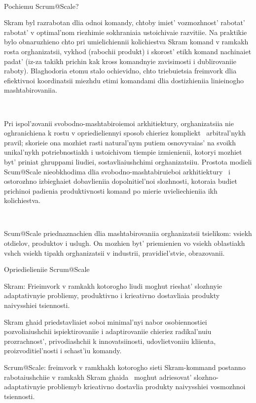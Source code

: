 \documentclass[10pt]{article}
\begin{document}
~

Pochiemu Scrum@Scale?

Skram byl razrabotan dlia odnoi komandy, chtoby imiet' vozmozhnost' rabotat'
rabotat' v optimal'nom riezhimie sokhraniaia ustoichivaie razvitiie. Na praktikie
bylo obnaruzhieno chto pri umielichiennii kolichiestva Skram komand v ramkakh
rosta orghanizatsii, vykhod (rabochii produkt) i skorost' etikh komand
nachinaiet padat' (iz-za takikh prichin kak kross komandnyie zavisimosti i
dublirovaniie raboty). Blaghodoria etomu stalo ochievidno, chto triebuietsia
freimvork dlia efiektivnoi koordinatsii miezhdu etimi komandami dlia
dostizhieniia linieinogho mashtabirovaniia.

~

Pri ispol'zovanii svobodno-mashtabiroiemoi arkhitiektury, orghanizatsiia nie
oghranichiena k rostu v opriedieliennyi sposob chieriez kompliekt~ arbitral'nykh
pravil; skorieie ona mozhiet rasti natural'nym putiem osnovyvaias' na svoikh
unikal'nykh potriebnostiakh i ustoichivom tiempie izmienienii, kotoryi mozhiet byt'
priniat ghruppami liudiei, sostavliaiushchimi orghanizatsiiu. Prostota modieli
Scum@Scale nieobkhodima dlia svobodno-mashtabiruieboi arkhitiektury~ i
ostorozhno izbieghaiet dobavlieniia dopolnitiel'noi slozhnosti, kotoraia budiet
prichinoi padienia produktivnosti komand po mierie uvieliechieniia ikh kolichiestva.

~

Scum@Scale priednaznachien dlia mashtabirovaniia orghanizatsii tsielikom: vsiekh
otdielov, produktov i uslugh. On mozhien byt' priemienien vo vsiekh oblastiakh vshch
vsiekh tipakh orghanizatsii v industrii, pravidiel'stvie, obrazovanii.

Opriedielieniie Scrum@Scale

Skram: Frieimvork v ramkakh kotorogho liudi moghut rieshat' slozhnyie
adaptativnyie probliemy, produktivno i krieativno dostavliaia produkty
naivysshiei tsiennosti.

Skram ghaid priedstavliaiet soboi minimal'nyi nabor osobiennostiei pozvoliaiushchii
ispiektirovaniie i adaptirovaniie chieriez radikal'nuiu prozrachnost',
privodiashchii k innovatsiinosti, udovlietvoniiu kliienta, proizvoditiel'nosti i
schast'iu komandy.

Scrum@Scale: freimvork v ramkhakh kotorogho sieti Skram-kommand postanno
rabotaiushchiie v ramkakh Skram ghaida~ moghut adriesovat' slozhno-adaptativnyie
probliemyb krieativno dostavlia produkty naivysshiei vosmozhnoi tsiennosti.
\end{document}
